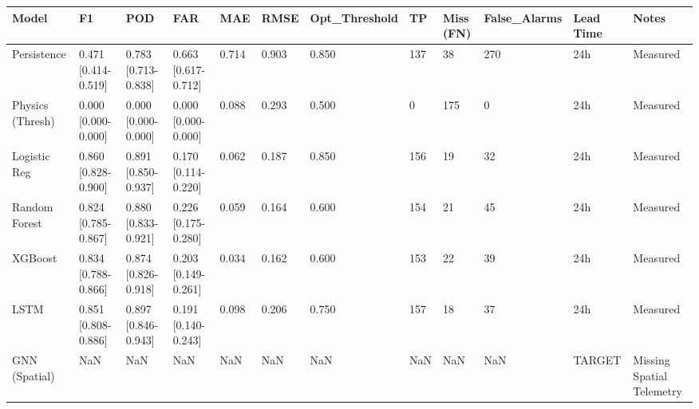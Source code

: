 \begin{tabular}{llllllllllll}
\toprule
Model & F1 & POD & FAR & MAE & RMSE & Opt_Threshold & TP & Miss (FN) & False_Alarms & Lead Time & Notes \\
\midrule
Persistence & 0.471 [0.414-0.519] & 0.783 [0.713-0.838] & 0.663 [0.617-0.712] & 0.714 & 0.903 & 0.850 & 137 & 38 & 270 & 24h & Measured \\
Physics (Thresh) & 0.000 [0.000-0.000] & 0.000 [0.000-0.000] & 0.000 [0.000-0.000] & 0.088 & 0.293 & 0.500 & 0 & 175 & 0 & 24h & Measured \\
Logistic Reg & 0.860 [0.828-0.900] & 0.891 [0.850-0.937] & 0.170 [0.114-0.220] & 0.062 & 0.187 & 0.850 & 156 & 19 & 32 & 24h & Measured \\
Random Forest & 0.824 [0.785-0.867] & 0.880 [0.833-0.921] & 0.226 [0.175-0.280] & 0.059 & 0.164 & 0.600 & 154 & 21 & 45 & 24h & Measured \\
XGBoost & 0.834 [0.788-0.866] & 0.874 [0.826-0.918] & 0.203 [0.149-0.261] & 0.034 & 0.162 & 0.600 & 153 & 22 & 39 & 24h & Measured \\
LSTM & 0.851 [0.808-0.886] & 0.897 [0.846-0.943] & 0.191 [0.140-0.243] & 0.098 & 0.206 & 0.750 & 157 & 18 & 37 & 24h & Measured \\
GNN (Spatial) & NaN & NaN & NaN & NaN & NaN & NaN & NaN & NaN & NaN & TARGET & Missing Spatial Telemetry \\
\bottomrule
\end{tabular}
